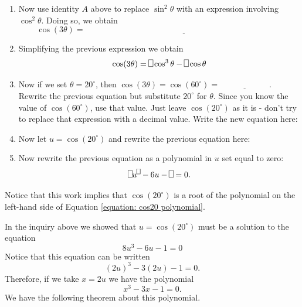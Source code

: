 \documentclass[11pt]{article}
\newenvironment{task}
	{\begin{mdframed}[linecolor=lightgray, linewidth=3pt]\raggedright}
	{\end{mdframed}}
\theoremstyle{definition}
\begin{document}
\begin{task}
\begin{enumerate}
    \item Now use identity $A$ above to replace $\sin^2\theta$ with an expression involving $\cos^2\theta$. Doing so, we obtain
      \[ \cos(3\theta) =\underline{\hspace{4in}} \]
    \item Simplifying the previous expression we obtain
      \[ \cos(3\theta) = \framebox(5,8){}\cos^3\theta - \framebox(5,8){}\cos\theta\]
    \item Now if we set $\theta = 20^\circ$, then $\cos(3\theta) = \cos(60^\circ) = \underline{\hspace{1in}}$. Rewrite the previous
      equation but substitute $20^\circ$ for $\theta$. Since you know the value of $\cos(60^\circ)$, use that value. Just leave
      $\cos(20^\circ)$ as it is - don't try to replace that expression with a decimal value. Write
      the new equation here:
      \[ \]
    \item Now let $u = \cos(20^\circ)$ and rewrite the previous equation here:
      \[ \]
    \item Now rewrite the previous equation as a polynomial in $u$ set equal to zero:
      \begin{equation}
       \framebox(5,8){}u^{\framebox(4,6){}} - 6u - \framebox(5,8){} = 0. 
        \label{equation: cos20 polynomial}
      \end{equation}
  \end{enumerate}
  Notice that this work implies that $\cos(20^\circ)$ is a root of the polynomial on the left-hand side of Equation \ref{equation: cos20 polynomial}.
\end{task}

In the inquiry above we showed that $u = \cos(20^\circ)$ must be a solution to the equation
\[ 8u^3 - 6u - 1 = 0\]
Notice that this equation can be written
 \[ (2u)^3 - 3(2u) - 1 =0. \]
 Therefore, if we take $x = 2u$ we have the polynomial
 \[ x^3 - 3x - 1 =0. \]
 We have the following theorem about this polynomial.
\end{document}
